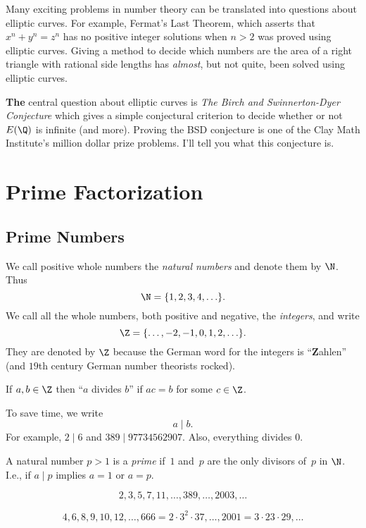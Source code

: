 \documentclass[11pt]{report}
\begin{document}
Many exciting problems in number theory can be translated
into questions about elliptic curves.
For example, Fermat's Last Theorem, which asserts that
$x^n + y^n = z^n$ has no positive integer solutions when $n>2$
was proved using elliptic curves.  Giving a method to decide
which numbers are the area of a right triangle with rational
side lengths has {\em almost}, but not quite, been solved using
elliptic curves.

  {\bf The} central question about elliptic curves is {\em The Birch and
    Swinnerton-Dyer Conjecture} which gives a simple conjectural criterion
to decide whether or not $E(\Q)$ is infinite (and more).  Proving the
BSD conjecture is one of the Clay Math Institute's million dollar
prize problems.  I'll tell you what this conjecture is.




\chapter{Prime Factorization}



\section{Prime Numbers}
We call positive whole numbers the {\em natural numbers} and denote
them by $\N$. Thus
$$\N = \{1,2,3,4,\ldots\}.$$
We call all the whole numbers, both positive and negative, the
  {\em integers}, and write
$$\Z = \{\ldots, -2, -1, 0, 1,2,\ldots\}.$$
They are denoted by $\Z$ because the German word
for the integers is ``{\bf Z}ahlen'' (and $19$th century
German number theorists rocked).


\begin{definition}
  If $a, b\in \Z$ then ``$a$ divides $b$''
  if $ac=b$ for some $c\in\Z$.
\end{definition}
To save time, we write
$$a \mid b.$$
For example, $2 \mid 6$ and $389\mid 97734562907$.
Also, everything divides $0$.

\begin{definition}
  A natural number $p>1$ is a {\em prime} if~$1$ and~$p$
  are the only divisors of~$p$ in $\N$.  I.e., if $a\mid p$ implies
  $a=1$ or $a=p$.
\end{definition}
$$2,3,5,7,11,\ldots,389,\ldots,2003,\ldots$$

$$4,6,8,9,10,12,\ldots,666=2\cdot 3^2\cdot 37, \ldots,
  2001=3\cdot 23\cdot 29,\ldots$$
\end{document}
